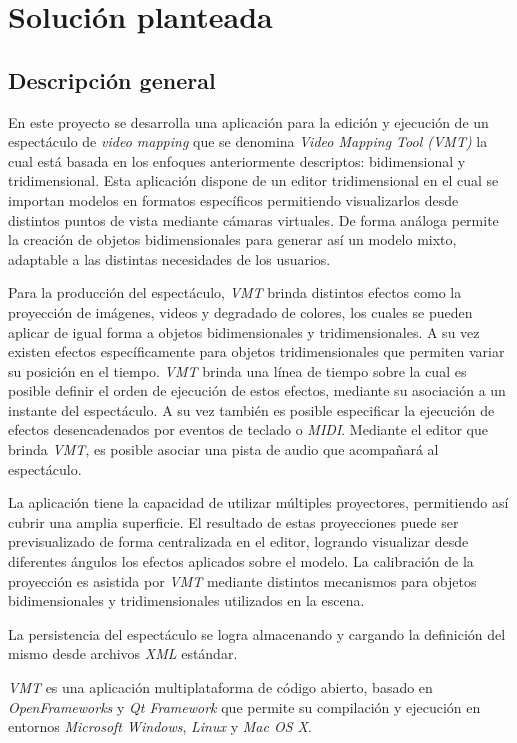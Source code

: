 \chapter{Solución planteada}
\section{Descripción general}

En este proyecto se desarrolla una aplicación para la edición y ejecución de un espectáculo de \emph{video mapping} que se denomina \emph{Video Mapping Tool (VMT)} la cual está basada en los enfoques anteriormente descriptos: bidimensional y tridimensional.
Esta aplicación dispone de un editor tridimensional en el cual se importan modelos en formatos específicos permitiendo visualizarlos desde distintos puntos de vista mediante cámaras virtuales. De forma análoga permite la creación de objetos bidimensionales para generar así un modelo mixto, adaptable a las distintas necesidades de los usuarios.

Para la producción del espectáculo, \emph{VMT} brinda distintos efectos como la proyección de imágenes, videos y degradado de colores, los cuales se pueden aplicar de igual forma a objetos bidimensionales y tridimensionales. A su vez existen efectos específicamente para objetos tridimensionales que permiten variar su posición en el tiempo.
\emph{VMT} brinda una línea de tiempo sobre la cual es posible definir el orden de ejecución de estos efectos, mediante su asociación a un instante del espectáculo. A su vez también es posible especificar la ejecución de efectos desencadenados por eventos de teclado o \emph{MIDI}.
Mediante el editor que brinda \emph{VMT}, es posible asociar una pista de audio que acompañará al espectáculo.

La aplicación tiene la capacidad de utilizar múltiples proyectores, permitiendo así cubrir una amplia superficie. El resultado de estas proyecciones puede ser previsualizado de forma centralizada en el editor, logrando visualizar desde diferentes ángulos los efectos aplicados sobre el modelo.
La calibración de la proyección es asistida por \emph{VMT} mediante distintos mecanismos para objetos bidimensionales y tridimensionales utilizados en la escena.

La persistencia del espectáculo se logra almacenando y cargando la definición del mismo desde archivos \emph{XML} estándar.

\emph{VMT} es una aplicación multiplataforma de código abierto, basado en \emph{OpenFrameworks}\cite{openframeworks} y \emph{Qt Framework}\cite{QT} que permite su compilación y ejecución en entornos \emph{Microsoft Windows}, \emph{Linux} y \emph{Mac OS X}.

